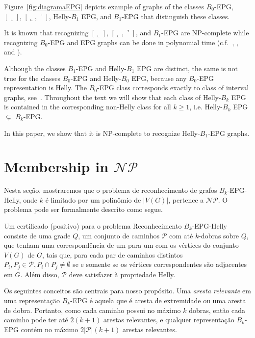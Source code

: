 Figure~\ref{fig:diagramaEPG} depicts example of graphs of the classes $B_0$-EPG, $[\llcorner]$, $[\llcorner, \urcorner]$, Helly-$B_1$ EPG, and $B_1$-EPG that distinguish these classes.

It is known that recognizing $[\llcorner]$, $[\llcorner, \urcorner]$, and $B_1$-EPG are NP-complete while recognizing $B_0$-EPG and EPG graphs can be done in polynomial time (c.f.~\cite{booth1976}, \cite{heldt2014}, and \cite{cameron2016edge}).

Although the classes $ B_1$-EPG and Helly-$B_1$ EPG are distinct, the same is not true for the classes $B_0$-EPG and Helly-$B_0 $ EPG, because any $B_0$-EPG representation is Helly.  The $B_0$-EPG class corresponds exactly to class of interval graphs, see~\citet{booth1976}. Throughout the text we will show that each class of Helly-$B_k$ EPG is contained in the corresponding non-Helly class for all $ k \geq 1$, i.e. Helly-$B_k$ EPG $ \subsetneq$ $B_k$-EPG.

In this paper, we show that it is NP-complete to recognize Helly-$B_1$-EPG graphs.

\section{Membership in $\mathcal{NP}$} \label{sec:NPpert}

Nesta seção, mostraremos que o problema de reconhecimento de grafos $B_k$-EPG-Helly, onde $k$ é limitado por um polinômio de $|V(G)|$, pertence a  $\mathcal{NP}$. O problema pode ser formalmente descrito como segue.



Um certificado (positivo) para o problema {\sc Reconhecimento $B_k$-EPG-Helly} consiste de uma grade $Q$, um conjunto de caminhos $\mathcal{P}$ com até $k$-dobras sobre $Q$, que tenham uma correspondência de um-para-um com os vértices do conjunto $V(G)$ de $G$, tais que, para cada par de caminhos distintos $P_i, P_j\in \mathcal{P}, P_i\cap P_j \neq \emptyset $  se e somente se os vértices correspondentes são adjacentes em $G$. Além disso, $\mathcal{P}$ deve satisfazer à propriedade Helly.

Os seguintes conceitos são centrais para nosso propósito.
Uma \emph{aresta relevante} em uma representação $B_k$-EPG é aquela que é aresta de extremidade ou uma aresta de dobra. Portanto, como cada caminho possui no máximo $k$ dobras, então cada caminho pode ter até $2(k+1)$ arestas relevantes, e qualquer representação $B_k$-EPG contém no máximo $2|\mathcal{P}|(k+1)$ arestas relevantes.

